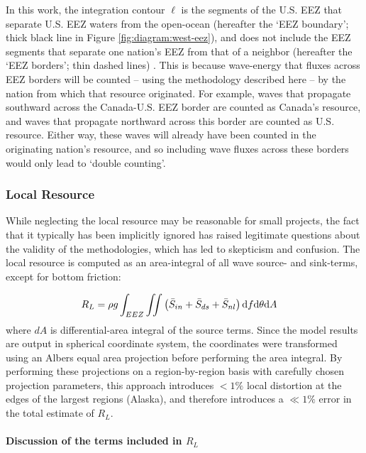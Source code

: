 In this work, the integration contour $\ell$ is the segments of the U.S. EEZ that separate U.S. EEZ waters from the open-ocean (hereafter the `EEZ boundary'; thick black line in Figure \ref{fig:diagram:west-eez}), and does not include the EEZ segments that separate one nation's EEZ from that of a neighbor (hereafter the `EEZ borders'; thin dashed lines) \citep[]{flandersmarineinstituteMaritimeBoundariesGeodatabase2018}. This is because wave-energy that fluxes across EEZ borders will be counted -- using the methodology described here -- by the nation from which that resource originated. For example, waves that propagate southward across the Canada-U.S. EEZ border are counted as Canada's resource, and waves that propagate northward across this border are counted as U.S. resource. Either way, these waves will already have been counted in the originating nation's resource, and so including wave fluxes across these borders would only lead to `double counting'.


\subsubsection{Local Resource} \label{sec:method:calc:local}

While neglecting the local resource may be reasonable for small projects, the fact that it
typically has been implicitly ignored has raised legitimate questions about the validity of the methodologies, which has led to skepticism and confusion. The local resource is computed as an area-integral of all wave source- and sink-terms, except for bottom friction:

\begin{align}
  R_L &= \rho g \int_{EEZ}\iint \left ( \bar{S}_{in} + \bar{S}_{ds} + \bar{S}_{nl} \right ) \mathrm{d} f \mathrm{d} \theta \mathrm{d} A
\label{eqn:RL}
\end{align}
where $dA$ is differential-area integral of the source terms. Since the model results are output in spherical coordinate system, the coordinates were transformed using an Albers equal area projection before performing the area integral. By performing these projections on a region-by-region basis with carefully chosen projection parameters, this approach introduces $<1\% $ local distortion at the edges of the largest regions (Alaska), and therefore introduces a $\ll 1\%$ error in the total estimate of $R_L$.

\paragraph{Discussion of the terms included in $R_L$}

